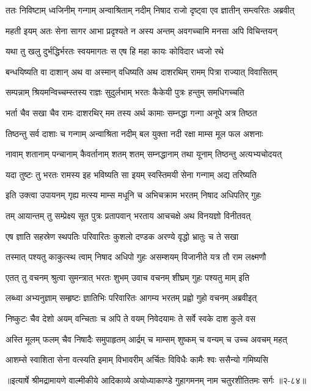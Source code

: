 
\twolineshloka
{ततः निविष्टाम् ध्वजिनीम् गन्गाम् अन्वाश्रिताम् नदीम्}
{निषाद राजो दृष्ट्वा एव ज्ञातीन् सम्त्वरितः अब्रवीत्} %

\twolineshloka
{महती इयम् अतः सेना सागर आभा प्रदृश्यते}
{न अस्य अन्तम् अवगच्चामि मनसा अपि विचिन्तयन्} %

\twolineshloka
{यथा तु खलु दुर्भद्धिर्भरतः स्वयमागतः}
{स एष हि महा कायः कोविदार ध्वजो रथे} %

\twolineshloka
{बन्धयिष्यति वा दाशान् अथ वा अस्मान् वधिष्यति}
{अथ दाशरथिम् रामम् पित्रा राज्यात् विवासितम्} %

\twolineshloka
{सम्पन्नाम् श्रियमन्विच्चम्स्तस्य राज्ञः सुदुर्लभाम्}
{भरतः कैकेयी पुत्रः हन्तुम् समधिगच्चति} %

\twolineshloka
{भर्ता चैव सखा चैव रामः दाशरथिर् मम}
{तस्य अर्थ कामाः सम्नद्धा गन्गा अनूपे अत्र तिष्ठत} %

\twolineshloka
{तिष्ठन्तु सर्व दाशाः च गन्गाम् अन्वाश्रिता नदीम्}
{बल युक्ता नदी रक्षा माम्स मूल फल अशनाः} %

\twolineshloka
{नावाम् शतानाम् पन्चानाम् कैवर्तानाम् शतम् शतम्}
{सम्नद्धानाम् तथा यूनाम् तिष्ठन्तु अत्यभ्यचोदयत्} %

\twolineshloka
{यदा तुष्टः तु भरतः रामस्य इह भविष्यति}
{सा इयम् स्वस्तिमयी सेना गन्गाम् अद्य तरिष्यति} %

\twolineshloka
{इति उक्त्वा उपायनम् गृह्य मत्स्य माम्स मधूनि च}
{अभिचक्राम भरतम् निषाद अधिपतिर् गुहः} %

\twolineshloka
{तम् आयान्तम् तु सम्प्रेक्ष्य सूत पुत्रः प्रतापवान्}
{भरताय आचचक्षे अथ विनयज्ञो विनीतवत्} %

\twolineshloka
{एष ज्ञाति सहस्रेण स्थपतिः परिवारितः}
{कुशलो दण्डक अरण्ये वृद्धो भ्रातुः च ते सखा} %

\twolineshloka
{तस्मात् पश्यतु काकुत्स्थ त्वाम् निषाद अधिपो गुहः}
{असम्शयम् विजानीते यत्र तौ राम लक्ष्मणौ} %

\twolineshloka
{एतत् तु वचनम् श्रुत्वा सुमन्त्रात् भरतः शुभम्}
{उवाच वचनम् शीघ्रम् गुहः पश्यतु माम् इति} %

\twolineshloka
{लब्ध्वा अभ्यनुज्ञाम् सम्हृष्टः ज्ञातिभिः परिवारितः}
{आगम्य भरतम् प्रह्वो गुहो वचनम् अब्रवीइत्} %

\twolineshloka
{निष्कुटः चैव देशो अयम् वन्चिताः च अपि ते वयम्}
{निवेदयामः ते सर्वे स्वके दाश कुले वस} %

\twolineshloka
{अस्ति मूलम् फलम् चैव निषादैः समुपाहृतम्}
{आर्द्रम् च माम्सम् शुष्कम् च वन्यम् च उच्च अवचम् महत्} %

\twolineshloka
{आशम्से स्वाशिता सेना वत्स्यति इमाम् विभावरीम्}
{अर्चितः विविधैः कामैः श्वः ससैन्यो गमिष्यसि} %


॥इत्यार्षे श्रीमद्रामायणे वाल्मीकीये आदिकाव्ये अयोध्याकाण्डे गुहागमनम् नाम चतुरशीतितमः सर्गः ॥२-८४॥
